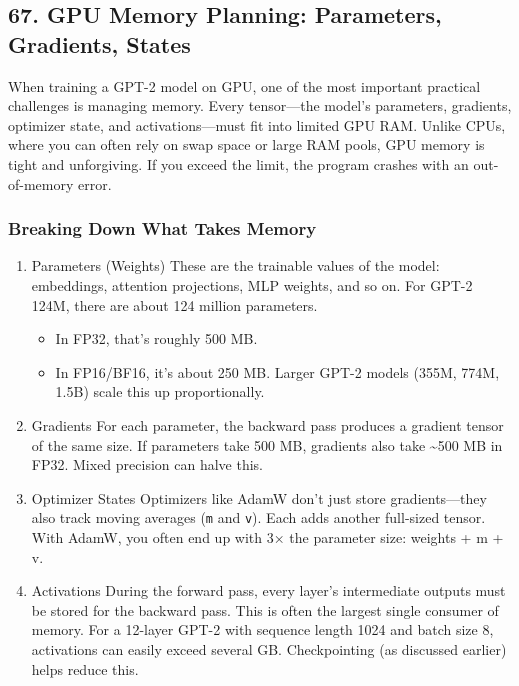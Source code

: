 \documentclass[
  letterpaper,
  DIV=11,
  numbers=noendperiod]{scrreprt}
\providecommand{\tightlist}{%
  \setlength{\itemsep}{0pt}\setlength{\parskip}{0pt}}
\begin{document}
\subsection{67. GPU Memory Planning: Parameters, Gradients,
States}\label{gpu-memory-planning-parameters-gradients-states}

When training a GPT-2 model on GPU, one of the most important practical
challenges is managing memory. Every tensor---the model's parameters,
gradients, optimizer state, and activations---must fit into limited GPU
RAM. Unlike CPUs, where you can often rely on swap space or large RAM
pools, GPU memory is tight and unforgiving. If you exceed the limit, the
program crashes with an out-of-memory error.

\subsubsection{Breaking Down What Takes
Memory}\label{breaking-down-what-takes-memory}

\begin{enumerate}
\def\labelenumi{\arabic{enumi}.}
\item
  Parameters (Weights) These are the trainable values of the model:
  embeddings, attention projections, MLP weights, and so on. For GPT-2
  124M, there are about 124 million parameters.

  \begin{itemize}
  \tightlist
  \item
    In FP32, that's roughly 500 MB.
  \item
    In FP16/BF16, it's about 250 MB. Larger GPT-2 models (355M, 774M,
    1.5B) scale this up proportionally.
  \end{itemize}
\item
  Gradients For each parameter, the backward pass produces a gradient
  tensor of the same size. If parameters take 500 MB, gradients also
  take \textasciitilde500 MB in FP32. Mixed precision can halve this.
\item
  Optimizer States Optimizers like AdamW don't just store
  gradients---they also track moving averages (\texttt{m} and
  \texttt{v}). Each adds another full-sized tensor. With AdamW, you
  often end up with 3× the parameter size: weights + m + v.
\item
  Activations During the forward pass, every layer's intermediate
  outputs must be stored for the backward pass. This is often the
  largest single consumer of memory. For a 12-layer GPT-2 with sequence
  length 1024 and batch size 8, activations can easily exceed several
  GB. Checkpointing (as discussed earlier) helps reduce this.
\end{enumerate}
\end{document}
